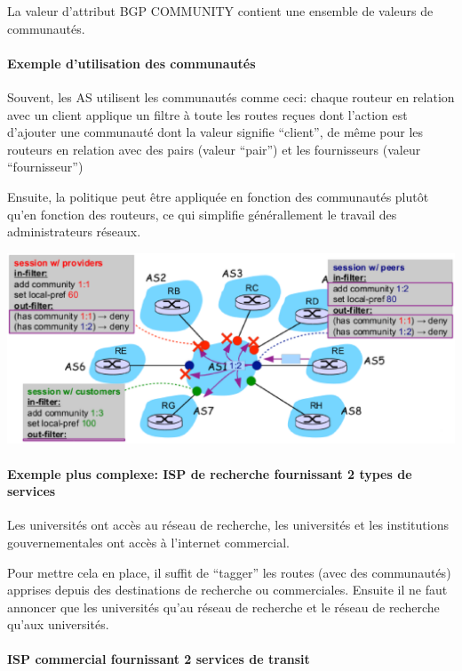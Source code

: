 \documentclass{report}
\begin{document}
La valeur d'attribut BGP COMMUNITY contient une ensemble de valeurs de
communautés.

\paragraph{Exemple d'utilisation des communautés}

Souvent, les AS utilisent les communautés comme ceci: chaque routeur
en relation avec un client applique un filtre à toute les routes
reçues dont l'action est d'ajouter une communauté dont la valeur
signifie ``client'', de même pour les routeurs en relation avec des
pairs (valeur ``pair'') et les fournisseurs (valeur ``fournisseur'')

Ensuite, la politique peut être appliquée en fonction des communautés
plutôt qu'en fonction des routeurs, ce qui simplifie générallement le
travail des administrateurs réseaux.

\includegraphics[width=\textwidth]{communities.eps}

\paragraph{Exemple plus complexe: ISP de recherche fournissant 2 types de
  services}

Les universités ont accès au réseau de recherche, les universités et
les institutions gouvernementales ont accès à l'internet commercial.

Pour mettre cela en place, il suffit de ``tagger'' les routes (avec
des communautés) apprises depuis des destinations de recherche ou
commerciales. Ensuite il ne faut annoncer que les universités qu'au
réseau de recherche et le réseau de recherche qu'aux universités.

\paragraph{ISP commercial fournissant 2 services de transit}
\end{document}
